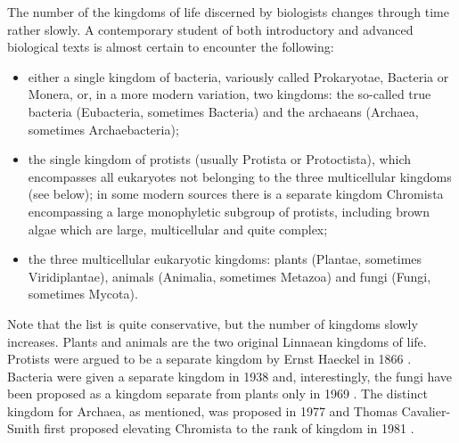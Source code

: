 \begin{artengenv}
The number of the kingdoms of life discerned by biologists changes through time rather slowly. A contemporary student of
both introductory and advanced biological texts is almost certain to encounter the following:

\begin{itemize}
\item either a single kingdom of bacteria, variously called Prokaryotae, Bacteria or Monera, or, in a more modern
variation, two kingdoms: the so-called true bacteria (Eubacteria, sometimes Bacteria) and the archaeans (Archaea,
sometimes Archaebacteria);
\item the single kingdom of protists (usually Protista or Protoctista), which encompasses all eukaryotes not belonging
to the three multicellular kingdoms (see below); in some modern sources
\parencite{ruggiero_higher_2015}
there is a separate kingdom Chromista encompassing a large monophyletic subgroup of protists, including brown
algae which are large, multicellular and quite complex;
\item the three multicellular eukaryotic kingdoms: plants (Plantae, sometimes Viridiplantae), animals (Animalia,
sometimes Metazoa) and fungi (Fungi, sometimes Mycota). 
\end{itemize}
Note that the list is quite conservative, but the number of kingdoms slowly increases. Plants and  animals are the two
original Linnaean kingdoms of life. Protists were argued to be a separate kingdom by Ernst Haeckel in 1866
\parencite{haeckel_generelle_1866}.
Bacteria were given a separate kingdom in 1938
\parencite{copeland_kingdoms_1938}
and, interestingly, the fungi have been proposed as a kingdom separate from
plants only in 1969
\parencite{whittaker_new_1969}.
The distinct kingdom for Archaea, as mentioned, was
proposed in 1977 and Thomas Cavalier-Smith first proposed elevating Chromista to the rank of kingdom in 1981
\parencite{cavalier-smith_eukaryote_1981}.


\end{artengenv}
